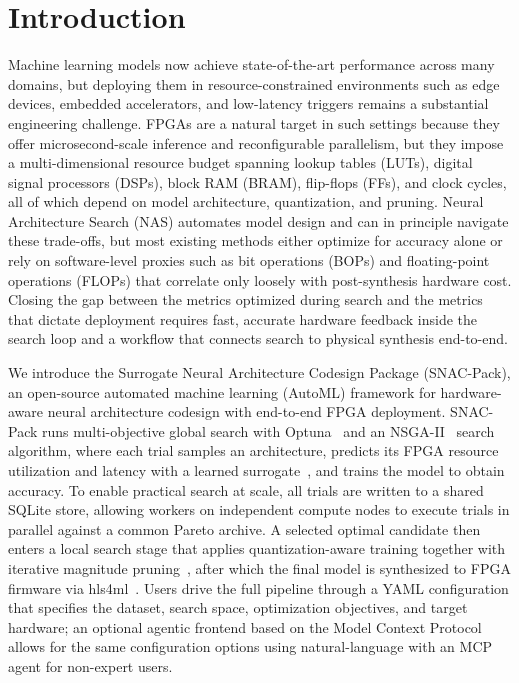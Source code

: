 \documentclass[11pt]{article}
\begin{document}
\section{Introduction}
\label{sec:intro}

Machine learning models now achieve state-of-the-art performance across many domains, but deploying them in resource-constrained environments such as edge devices, embedded accelerators, and low-latency triggers remains a substantial engineering challenge.
FPGAs are a natural target in such settings because they offer microsecond-scale inference and reconfigurable parallelism, but they impose a multi-dimensional resource budget spanning lookup tables (LUTs), digital signal processors (DSPs), block RAM (BRAM), flip-flops (FFs), and clock cycles, all of which depend on model architecture, quantization, and pruning.
Neural Architecture Search (NAS) automates model design and can in principle navigate these trade-offs, but most existing methods either optimize for accuracy alone or rely on software-level proxies such as bit operations (BOPs) and floating-point operations (FLOPs) that correlate only loosely with post-synthesis hardware cost.
Closing the gap between the metrics optimized during search and the metrics that dictate deployment requires fast, accurate hardware feedback inside the search loop and a workflow that connects search to physical synthesis end-to-end.

We introduce the Surrogate Neural Architecture Codesign Package (SNAC-Pack), an open-source automated machine learning (AutoML) framework for hardware-aware neural architecture codesign with end-to-end FPGA deployment.
SNAC-Pack runs multi-objective global search with Optuna~\citep{optuna_2019} and an NSGA-II~\citep{NSGA} search algorithm, where each trial samples an architecture, predicts its FPGA resource utilization and latency with a learned surrogate~\citep{Rahimifar_2025}, and trains the model to obtain accuracy.
To enable practical search at scale, all trials are written to a shared SQLite store, allowing workers on independent compute nodes to execute trials in parallel against a common Pareto archive.
A selected optimal candidate then enters a local search stage that applies quantization-aware training together with iterative magnitude pruning~\citep{quantization_survey,modelcompression}, after which the final model is synthesized to FPGA firmware via hls4ml~\citep{hls4ml,fastml_hls4ml}.
Users drive the full pipeline through a YAML configuration that specifies the dataset, search space, optimization objectives, and target hardware; an optional agentic frontend based on the Model Context Protocol allows for the same configuration options using natural-language with an MCP agent for non-expert users.
\end{document}
